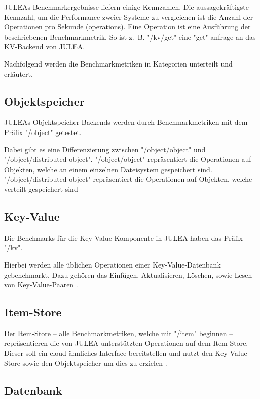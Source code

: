 JULEAs Benchmarkergebnisse liefern einige Kennzahlen. Die aussagekräftigste Kennzahl, um die Performance zweier Systeme zu vergleichen ist die Anzahl der Operationen pro Sekunde (operations). Eine Operation ist eine Ausführung der beschriebenen Benchmarkmetrik. So ist z. B. "/kv/get" eine "get" anfrage an das KV-Backend von JULEA. 

Nachfolgend werden die Benchmarkmetriken in Kategorien unterteilt und erläutert.

\subsection{Objektspeicher}

JULEAs Objektspeicher-Backends werden durch Benchmarkmetriken mit dem Präfix "/object" getestet.

Dabei gibt es eine Differenzierung zwischen "/object/object" und "/object/distributed-object". "/object/object" repräsentiert die Operationen auf Objekten, welche an einem einzelnen Dateisystem gespeichert sind. "/object/distributed-object" repräsentiert die Operationen auf Objekten, welche verteilt gespeichert sind \cite[Vgl. S. 718]{kuhnJULEAFlexibleStorage2017}

\subsection{Key-Value}

Die Benchmarks für die Key-Value-Komponente in JULEA haben das Präfix "/kv".

Hierbei werden alle üblichen Operationen einer Key-Value-Datenbank gebenchmarkt. Dazu gehören das Einfügen, Aktualisieren, Löschen, sowie Lesen von Key-Value-Paaren \cite[Vgl. S. 718]{kuhnJULEAFlexibleStorage2017}.

\subsection{Item-Store}

Der Item-Store – alle Benchmarkmetriken, welche mit "/item" beginnen – repräsentieren die von JULEA unterstützten Operationen auf dem Item-Store. Dieser soll ein cloud-ähnliches Interface bereitstellen und nutzt den Key-Value-Store sowie den Objektspeicher um dies zu erzielen \cite[Vgl. 718]{kuhnJULEAFlexibleStorage2017}.

\subsection{Datenbank}

